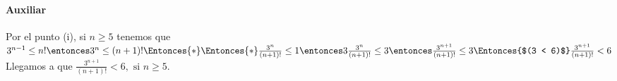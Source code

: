 \begin{enumerate}[label=\roman*)]
        \paragraph{Auxiliar}{Por el punto (i), si $n \geq 5$ tenemos que $3^{n-1} \leq n! \entonces 3^{n} \leq
            (n+1)! \Entonces{*} \\
            \Entonces{*}  \frac{3^n}{(n+1)!} \leq 1 \entonces 3\frac{3^n}{(n+1)!} \leq 3 \entonces
            \frac{3^{n+1}}{(n+1)!} \leq 3 \Entonces{$(3 < 6)$} \frac{3^{n+1}}{(n+1)!} < 6 $\\
          Llegamos a que $ \frac{3^{n+1}}{(n+1)!} < 6, \text{ si } n \geq 5$.}
\end{enumerate}

\begin{aportes}
  \item {}
\end{aportes}
